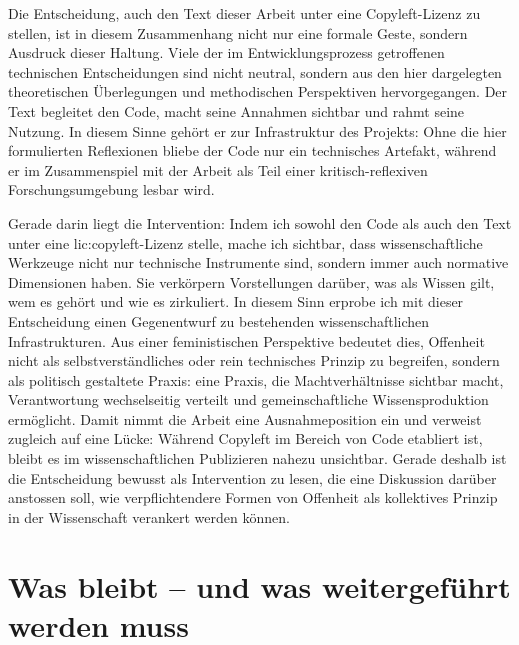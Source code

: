 Die Entscheidung, auch den Text dieser Arbeit unter eine Copyleft-Lizenz zu stellen, ist in diesem Zusammenhang nicht nur eine formale Geste, sondern Ausdruck dieser Haltung. Viele der im Entwicklungsprozess getroffenen technischen Entscheidungen sind nicht neutral, sondern aus den hier dargelegten theoretischen Überlegungen und methodischen Perspektiven hervorgegangen. Der Text begleitet den Code, macht seine Annahmen sichtbar und rahmt seine Nutzung. In diesem Sinne gehört er zur Infrastruktur des Projekts: Ohne die hier formulierten Reflexionen bliebe der Code nur ein technisches Artefakt, während er im Zusammenspiel mit der Arbeit als Teil einer kritisch-reflexiven Forschungsumgebung lesbar wird. 

Gerade darin liegt die Intervention: Indem ich sowohl den Code als auch den Text unter eine \gls{lic:copyleft}-Lizenz stelle, mache ich sichtbar, dass wissenschaftliche Werkzeuge nicht nur technische Instrumente sind, sondern immer auch normative Dimensionen haben. Sie verkörpern Vorstellungen darüber, was als Wissen gilt, wem es gehört und wie es zirkuliert. In diesem Sinn erprobe ich mit dieser Entscheidung einen Gegenentwurf zu bestehenden wissenschaftlichen Infrastrukturen. %
Aus einer feministischen Perspektive bedeutet dies, Offenheit nicht als selbstverständliches oder rein technisches Prinzip zu begreifen, sondern als politisch gestaltete Praxis: eine Praxis, die Machtverhältnisse sichtbar macht, Verantwortung wechselseitig verteilt und gemeinschaftliche Wissensproduktion ermöglicht. %
 Damit nimmt die Arbeit eine Ausnahmeposition ein und verweist zugleich auf eine Lücke: Während Copyleft im Bereich von Code etabliert ist, bleibt es im wissenschaftlichen Publizieren nahezu unsichtbar. Gerade deshalb ist die Entscheidung bewusst als Intervention zu lesen, die eine Diskussion darüber anstossen soll, wie verpflichtendere Formen von Offenheit als kollektives Prinzip in der Wissenschaft verankert werden können.


\section{Was bleibt -- und was weitergeführt werden muss}

